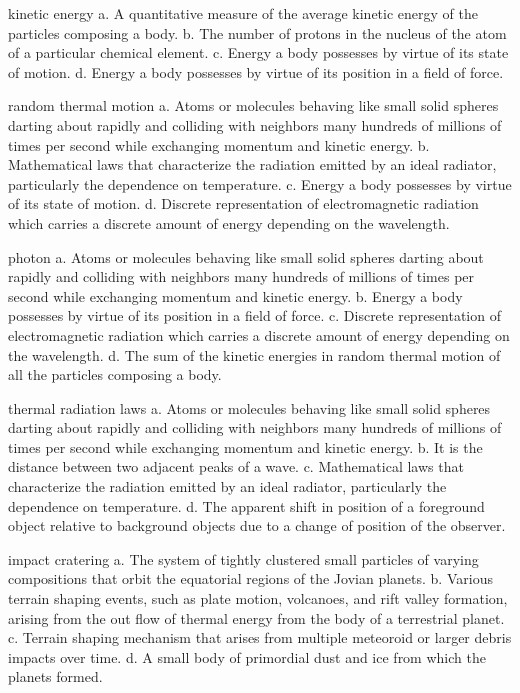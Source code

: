     kinetic energy
    a. A quantitative measure of the average kinetic energy of the particles composing a body.
    b. The number of protons in the nucleus of the atom of a particular chemical element.
    c. Energy a body possesses by virtue of its state of motion.
    d. Energy a body possesses by virtue of its position in a field of force.

    random thermal motion
    a. Atoms or molecules behaving like small solid spheres darting about rapidly and colliding with neighbors many hundreds of millions of times per second while exchanging momentum and kinetic energy.
    b. Mathematical laws that characterize the radiation emitted by an ideal radiator, particularly the dependence on temperature.
    c. Energy a body possesses by virtue of its state of motion.
    d. Discrete representation of electromagnetic radiation which carries a discrete amount of energy depending on the wavelength.

    photon
    a. Atoms or molecules behaving like small solid spheres darting about rapidly and colliding with neighbors many hundreds of millions of times per second while exchanging momentum and kinetic energy.
    b. Energy a body possesses by virtue of its position in a field of force.
    c. Discrete representation of electromagnetic radiation which carries a discrete amount of energy depending on the wavelength.
    d. The sum of the kinetic energies in random thermal motion of all the particles composing a body.

    thermal radiation laws
    a. Atoms or molecules behaving like small solid spheres darting about rapidly and colliding with neighbors many hundreds of millions of times per second while exchanging momentum and kinetic energy.
    b. It is the distance between two adjacent peaks of a wave.
    c. Mathematical laws that characterize the radiation emitted by an ideal radiator, particularly the dependence on temperature.
    d. The apparent shift in position of a foreground object relative to background objects due to a change of position of the observer.

    impact cratering
    a. The system of tightly clustered small particles of varying compositions that orbit the equatorial regions of the Jovian planets.
    b. Various terrain shaping events, such as plate motion, volcanoes, and rift valley formation, arising from the out flow of thermal energy from the body of a terrestrial planet.
    c. Terrain shaping mechanism that arises from multiple meteoroid or larger debris impacts over time.
    d. A small body of primordial dust and ice from which the planets formed.


